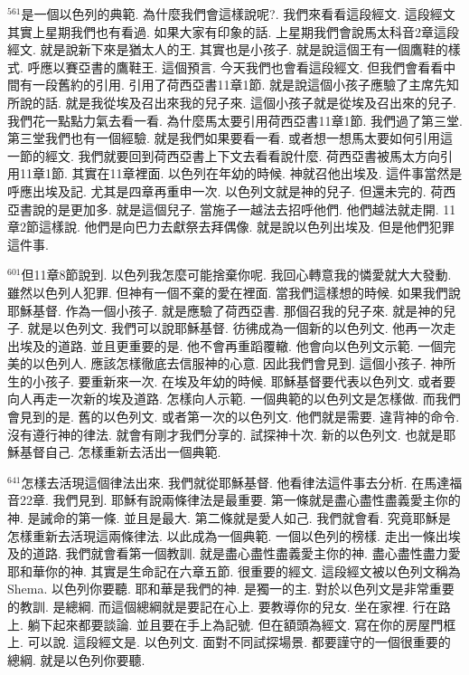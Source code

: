 \documentclass{book}
\begin{document}
$^{561}$是一個以色列的典範.
為什麼我們會這樣說呢?.
我們來看看這段經文.
這段經文其實上星期我們也有看過.
如果大家有印象的話.
上星期我們會說馬太科音2章這段經文.
就是說新下來是猶太人的王.
其實也是小孩子.
就是說這個王有一個鷹鞋的樣式.
呼應以賽亞書的鷹鞋王.
這個預言.
今天我們也會看這段經文.
但我們會看看中間有一段舊約的引用.
引用了荷西亞書11章1節.
就是說這個小孩子應驗了主席先知所說的話.
就是我從埃及召出來我的兒子來.
這個小孩子就是從埃及召出來的兒子.
我們花一點點力氣去看一看.
為什麼馬太要引用荷西亞書11章1節.
我們過了第三堂.
第三堂我們也有一個經驗.
就是我們如果要看一看.
或者想一想馬太要如何引用這一節的經文.
我們就要回到荷西亞書上下文去看看說什麼.
荷西亞書被馬太方向引用11章1節.
其實在11章裡面.
以色列在年幼的時候.
神就召他出埃及.
這件事當然是呼應出埃及記.
尤其是四章再重申一次.
以色列文就是神的兒子.
但還未完的.
荷西亞書說的是更加多.
就是這個兒子.
當施子一越法去招呼他們.
他們越法就走開.
11章2節這樣說.
他們是向巴力去獻祭去拜偶像.
就是說以色列出埃及.
但是他們犯罪這件事.

$^{601}$但11章8節說到.
以色列我怎麼可能捨棄你呢.
我回心轉意我的憐愛就大大發動.
雖然以色列人犯罪.
但神有一個不棄的愛在裡面.
當我們這樣想的時候.
如果我們說耶穌基督.
作為一個小孩子.
就是應驗了荷西亞書.
那個召我的兒子來.
就是神的兒子.
就是以色列文.
我們可以說耶穌基督.
彷彿成為一個新的以色列文.
他再一次走出埃及的道路.
並且更重要的是.
他不會再重蹈覆轍.
他會向以色列文示範.
一個完美的以色列人.
應該怎樣徹底去信服神的心意.
因此我們會見到.
這個小孩子.
神所生的小孩子.
要重新來一次.
在埃及年幼的時候.
耶穌基督要代表以色列文.
或者要向人再走一次新的埃及道路.
怎樣向人示範.
一個典範的以色列文是怎樣做.
而我們會見到的是.
舊的以色列文.
或者第一次的以色列文.
他們就是需要.
違背神的命令.
沒有遵行神的律法.
就會有剛才我們分享的.
試探神十次.
新的以色列文.
也就是耶穌基督自己.
怎樣重新去活出一個典範.

$^{641}$怎樣去活現這個律法出來.
我們就從耶穌基督.
他看律法這件事去分析.
在馬達福音22章.
我們見到.
耶穌有說兩條律法是最重要.
第一條就是盡心盡性盡義愛主你的神.
是誡命的第一條.
並且是最大.
第二條就是愛人如己.
我們就會看.
究竟耶穌是怎樣重新去活現這兩條律法.
以此成為一個典範.
一個以色列的榜樣.
走出一條出埃及的道路.
我們就會看第一個教訓.
就是盡心盡性盡義愛主你的神.
盡心盡性盡力愛耶和華你的神.
其實是生命記在六章五節.
很重要的經文.
這段經文被以色列文稱為Shema.
以色列你要聽.
耶和華是我們的神.
是獨一的主.
對於以色列文是非常重要的教訓.
是總綱.
而這個總綱就是要記在心上.
要教導你的兒女.
坐在家裡.
行在路上.
躺下起來都要談論.
並且要在手上為記號.
但在額頭為經文.
寫在你的房屋門框上.
可以說.
這段經文是.
以色列文.
面對不同試探場景.
都要謹守的一個很重要的總綱.
就是以色列你要聽.
\end{document}
